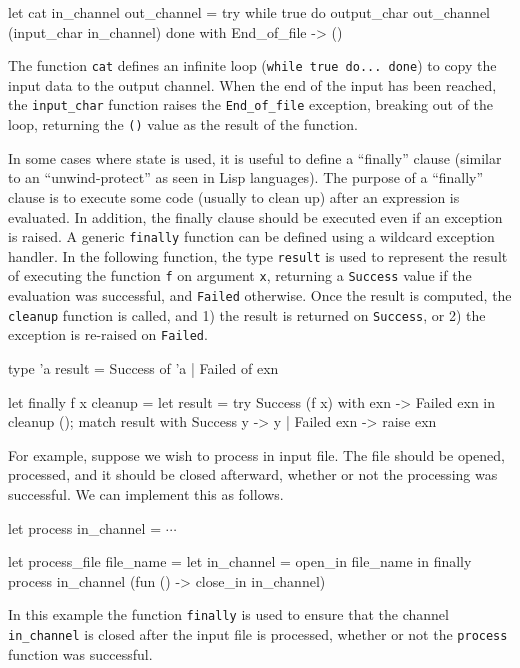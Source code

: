 \begin{ocaml}
let cat in_channel out_channel =
   try
      while true do
         output_char out_channel (input_char in_channel)
      done
   with
      End_of_file ->
         ()
\end{ocaml}
%
The function \hbox{\lstinline/cat/} defines an infinite loop (\hbox{\lstinline/while true do... done/}) to copy the input
data to the output channel.  When the end of the input has been reached, the \hbox{\lstinline/input_char/}
function raises the \hbox{\lstinline/End_of_file/} exception, breaking out of the loop, returning the \hbox{\lstinline/()/}
value as the result of the function.


In some cases where state is used, it is useful to define a ``finally'' clause (similar to an
``unwind-protect'' as seen in Lisp languages).  The purpose of a ``finally'' clause is to execute
some code (usually to clean up) after an expression is evaluated.  In addition, the finally clause
should be executed even if an exception is raised.  A generic \hbox{\lstinline/finally/} function can be defined
using a wildcard exception handler. In the following function, the type \hbox{\lstinline/result/} is used to
represent the result of executing the function \hbox{\lstinline/f/} on argument \hbox{\lstinline/x/}, returning a \hbox{\lstinline/Success/}
value if the evaluation was successful, and \hbox{\lstinline/Failed/} otherwise.  Once the result is computed,
the \hbox{\lstinline/cleanup/} function is called, and 1) the result is returned on \hbox{\lstinline/Success/}, or 2) the
exception is re-raised on \hbox{\lstinline/Failed/}.

\begin{ocaml}
type 'a result =
   Success of 'a
 | Failed of exn

let finally f x cleanup =
   let result =
      try Success (f x) with
         exn ->
            Failed exn
   in
      cleanup ();
      match result with
         Success y -> y
       | Failed exn -> raise exn
\end{ocaml}
%
For example, suppose we wish to process in input file. The file should be opened, processed, and it
should be closed afterward, whether or not the processing was successful.  We can implement this as
follows.

\begin{ocaml}
let process in_channel = $\cdots$

let process_file file_name =
   let in_channel = open_in file_name in
      finally process in_channel (fun () -> close_in in_channel)
\end{ocaml}
%
In this example the function \hbox{\lstinline/finally/} is used to ensure that the channel \hbox{\lstinline/in_channel/} is closed
after the input file is processed, whether or not the \hbox{\lstinline/process/} function was successful.

